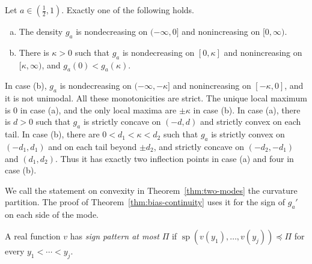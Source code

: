 \begin{theorem}\label{thm:two-modes}
Let $a\in(\frac12,1)$. Exactly one of the following holds.
\begin{enumerate}[(a)]
\item The density $g_a$ is nondecreasing on $(-\infty,0]$ and nonincreasing on
$[0,\infty)$.
\item There is $\kappa>0$ such that $g_a$ is nondecreasing on $[0,\kappa]$ and
nonincreasing on $[\kappa,\infty)$, and $g_a(0)<g_a(\kappa)$.
\end{enumerate}
In case (b), $g_a$ is nondecreasing on $(-\infty,-\kappa]$ and nonincreasing on
$[-\kappa,0]$, and it is not unimodal. All these monotonicities are strict.
The unique local maximum is $0$ in case (a), and the only local maxima
are $\pm \kappa$ in case (b).
In case (a), there is $d>0$ such that $g_a$ is strictly concave on
$(-d,d)$ and strictly convex on each tail. In case (b), there are
$0<d_1<\kappa<d_2$ such that $g_a$ is strictly convex on $(-d_1,d_1)$ and
on each tail beyond $\pm d_2$, and strictly concave on
$(-d_2,-d_1)$ and $(d_1,d_2)$. Thus it has exactly two inflection points
in case (a) and four in case (b).
\end{theorem}

We call the statement on convexity in Theorem~\ref{thm:two-modes} the
curvature partition. The proof of Theorem~\ref{thm:bias-continuity}
uses it for the sign of $g_a'$ on each side of the mode.

A real function $v$ has \emph{sign pattern at most} $\Pi$ if
$\operatorname{sp}(v(y_1),\ldots,v(y_j))\preceq\Pi$ for every
$y_1<\cdots<y_j$.


